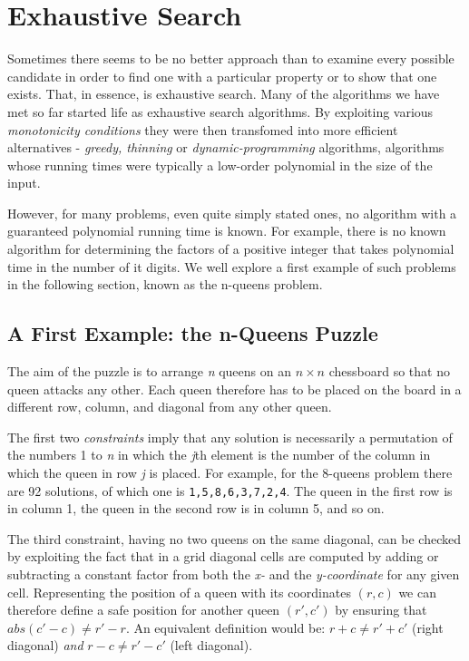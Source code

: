 \chapter{Exhaustive Search}

Sometimes there seems to be no better approach than to examine every possible candidate in order to find one with a particular property or to show that one exists.
That, in essence, is exhaustive search.
Many of the algorithms we have met so far started life as exhaustive search algorithms.
By exploiting various \emph{monotonicity conditions} they were then transfomed into more efficient alternatives - \emph{greedy, thinning} or \emph{dynamic-programming} algorithms, algorithms whose running times were typically a low-order polynomial in the size of the input.

However, for many problems, even quite simply stated ones, no algorithm with a guaranteed polynomial running time is known.
For example, there is no known algorithm for determining the factors of a positive integer that takes polynomial time in the number of it digits.
We well explore a first example of such problems in the following section, known as the n-queens problem.

\section{A First Example: the n-Queens Puzzle}
The aim of the puzzle is to arrange \emph{n} queens on an $n \times n$ chessboard so that no queen attacks any other. Each queen therefore has to be placed on the board in a different row, column, and diagonal from any other queen.

The first two \emph{constraints} imply that any solution is necessarily a permutation of the numbers 1 to \emph{n} in which the \emph{j}th element is the number of the column in which the queen in row \emph{j} is placed.
For example, for the 8-queens problem there are 92 solutions, of which one is \texttt{1,5,8,6,3,7,2,4}. The queen in the first row is in column 1, the queen in the second row is in column 5, and so on.

The third constraint, having no two queens on the same diagonal, can be checked by exploiting the fact that in a grid diagonal cells are computed by adding or subtracting a constant factor from both the \emph{x-} and the \emph{y-coordinate} for any given cell.
Representing the position of a queen with its coordinates $(r, c)$ we can therefore define a safe position for another queen $(r', c')$ by ensuring that $abs(c' - c) \neq r' - r$.
An equivalent definition would be: $r + c \neq r' + c'$ (right diagonal) \emph{and} $r - c \neq r' - c '$ (left diagonal).

